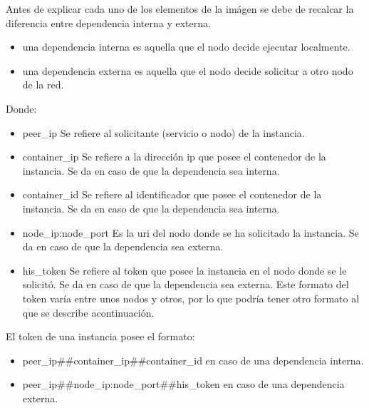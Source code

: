 \documentclass[11pt]{article}
\begin{document}
				Antes de explicar cada uno de los elementos de la imágen se debe de recalcar la diferencia entre dependencia interna y externa.
				\begin{itemize}
					\item una dependencia interna es aquella que el nodo decide ejecutar localmente.
					\item una dependencia externa es aquella que el nodo decide solicitar a otro nodo de la red.
				\end{itemize}
				Donde:
				\begin{itemize}
					\item peer\_ip Se refiere al solicitante (servicio o nodo) de la instancia.
					\item container\_ip Se refiere a la dirección ip que posee el contenedor de la instancia. Se da en caso de que la dependencia sea interna.
					\item container\_id Se refiere al identificador que posee el contenedor de la instancia. Se da en caso de que la dependencia sea interna.
					\item node\_ip:node\_port Es la uri del nodo donde se ha solicitado la instancia. Se da en caso de que la dependencia sea externa.
					\item his\_token Se refiere al token que posee la instancia en el nodo donde se le solicitó. Se da en caso de que la dependencia sea externa.
						Este formato del token varía entre unos nodos y otros, por lo que podría tener otro formato al que se describe acontinuación.
				\end{itemize}
				
				El token de una instancia posee el formato:
				\begin{itemize}
					\item peer\_ip\#\#container\_ip\#\#container\_id en caso de una dependencia interna.
					\item peer\_ip\#\#node\_ip:node\_port\#\#his\_token en caso de una dependencia externa. \\
				\end{itemize}
\end{document}
